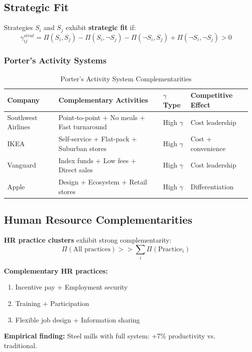 \subsection{Strategic Fit}

\begin{definition}
Strategies $S_i$ and $S_j$ exhibit \textbf{strategic fit} if:
\begin{equation}
\gamma^{strat}_{ij} = \Pi(S_i, S_j) - \Pi(S_i, \neg S_j) - \Pi(\neg S_i, S_j) + \Pi(\neg S_i, \neg S_j) > 0
\end{equation}
\end{definition}

\subsubsection{Porter's Activity Systems}

\begin{table}[h]
\centering
\caption{Porter's Activity System Complementarities}
\label{tab:porter-gamma}
\renewcommand{\arraystretch}{1.2}
\small
\begin{tabular}{@{}p{2.5cm}p{4cm}p{2cm}p{3cm}@{}}
\toprule
\textbf{Company} & \textbf{Complementary Activities} & \textbf{$\gamma$ Type} & \textbf{Competitive Effect} \\
\midrule
Southwest Airlines & Point-to-point + No meals + Fast turnaround & High $\gamma$ & Cost leadership \\
IKEA & Self-service + Flat-pack + Suburban stores & High $\gamma$ & Cost + convenience \\
Vanguard & Index funds + Low fees + Direct sales & High $\gamma$ & Cost leadership \\
Apple & Design + Ecosystem + Retail stores & High $\gamma$ & Differentiation \\
\bottomrule
\end{tabular}
\end{table}

\subsection{Human Resource Complementarities}

\begin{theorem}[Ichniowski et al., 1997]
\textbf{HR practice clusters} exhibit strong complementarity:
\begin{equation}
\Pi(\text{All practices}) >> \sum_i \Pi(\text{Practice}_i)
\end{equation}

\textbf{Complementary HR practices:}
\begin{enumerate}[noitemsep]
    \item Incentive pay + Employment security
    \item Training + Participation
    \item Flexible job design + Information sharing
\end{enumerate}

\textbf{Empirical finding:} Steel mills with full system: +7\% productivity vs. traditional.
\end{theorem}

